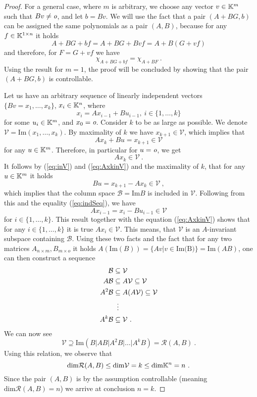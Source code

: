 \begin{proof}
    For a general case, where $m$ is arbitrary, we choose any vector $v\in\mathbb{K}^m$ such that $Bv\neq \textit{o}$, and let $b=Bv$. We will use the fact that a pair $(A+BG,b)$ can be assigned the same polynomials as a pair $(A,B)$, because for any $f\in\mathbb{K}^{1\times n}$ it holds
    $${A+BG+bf}={A+BG+Bvf}={A+B(G+vf)}$$
    and therefore, for $F=G+vf$ we have 
    $$\chi_{A+BG+bf}=\chi_{A+BF}\ .$$
    Using the result for $m=1$, the proof will be concluded by showing that the pair $(A+BG,b)$ is controllable.
       
    Let us have an arbitrary sequence of linearly independent vectors $\{Bv=x_1,\ldots,x_k\}$, $x_i\in\mathbb{K}^n$, where
    \begin{equation}
    \label{eq:indSeq}
        x_{i}=Ax_{i-1}+Bu_{i-1},\ i\in\{1,\ldots,k\}
    \end{equation}
    for some $u_i\in\mathbb{K}^m$, and $x_0=\textit{o}$. Consider $k$ to be as large as possible. We denote $\mathcal{V}=\text{Im}(x_1,\ldots,x_k)$. By maximality of $k$ we have $x_{k+1}\in\mathcal{V}$, which implies that
    \begin{equation}
    \label{eq:inV}    
        Ax_k+Bu=x_{k+1}\in\mathcal{V}
    \end{equation}
    for any $u\in\mathbb{K}^m$. Therefore, in particular for $u=\textit{o}$, we get 
    \begin{equation}
    \label{eq:AxkinV}
        Ax_k\in\mathcal{V}\ .
    \end{equation}
    It follows by (\ref{eq:inV}) and (\ref{eq:AxkinV}) and the maximality of $k$, that for any $u\in\mathbb{K}^m$ it holds
    $$Bu=x_{k+1}-Ax_k\in\mathcal{V}\ ,$$
    which implies that the column space $\mathcal{B}=\text{Im}B$ is included in $\mathcal{V}$. Following from this and the equality (\ref{eq:indSeq}), we have 
    $$Ax_{i-1}=x_i-Bu_{i-1}\in\mathcal{V}$$
    for $i\in\{1,\ldots,k\}$. This result together with the equation (\ref{eq:AxkinV}) shows that for any $i\in\{1,\ldots,k\}$ it is true $Ax_i\in\mathcal{V}$. This means, that $\mathcal{V}$ is an $A$-invariant subspace containing $\mathcal{B}$. Using these two facts and the fact that for any two matrices $A_{n\times m},B_{m\times o}$ it holds $A(\text{Im}(B))=\{Av|v\in\text{Im(B)}\}=\text{Im}(AB)$, one can then construct a sequence
    \begin{align*}
        \mathcal{B}&\subseteq\mathcal{V} \\
        A\mathcal{B}&\subseteq A\mathcal{V}\subseteq\mathcal{V} \\
        A^2\mathcal{B}&\subseteq A(A\mathcal{V})\subseteq\mathcal{V} \\
        &\vdotswithin{\subseteq} \\
        A^k\mathcal{B}&\subseteq\mathcal{V}
        \ .
    \end{align*}
    We can now see
    $$\mathcal{V}\supseteq\text{Im}(B|AB|A^2B|\ldots|A^kB)=\mathcal{R}(A,B)\ .$$
    Using this relation, we observe that
    $$\text{dim}\mathcal{R}(A,B)\leq\text{dim}\mathcal{V}=k\leq\text{dim}\K^n=n\ .$$
    Since the pair $(A,B)$ is by the assumption controllable (meaning $\text{dim}\mathcal{R}(A,B)=n$) we arrive at conclusion $n=k$.


\end{proof}
